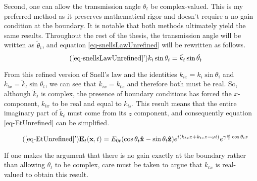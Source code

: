 \documentclass[12pt]{uthesis-v12}
\begin{document}
Second, one can allow the transmission angle $\theta_t$ be complex-valued. This is my preferred method as it preserves mathematical rigor and doesn't require a no-gain condition at the boundary. It is notable that both methods ultimately yield the same results. Throughout the rest of the thesis, the transmission angle will be written as $\tilde{\theta}_t$, and equation \ref{eq-snellsLawUnrefined} will be rewritten as follows.
\begin{equation}\label{eq-snellsLaw}
\tag{\ref{eq-snellsLawUnrefined}'}
k_i\sin\theta_i=\tilde{k_t}\sin\tilde{\theta_t}
\end{equation}

From this refined version of Snell's law and the identities $k_{ix}=k_i\sin\theta_i$ and $k_{tx}=\tilde{k}_t\sin\theta_t$, we can see that $k_{ix}=k_{tx}$ and therefore both must be real. So, although $\tilde{k}_t$ is complex, the presence of boundary conditions has forced the $x$-component, $k_{tx}$ to be real and equal to $k_{is}$. This result means that the entire imaginary part of $\tilde{k}_t$ must come from its $z$ component, and consequently equation \ref{eq-EtUnrefined} can be simplified.

\begin{equation}
\label{eq-Et}
\tag{\ref{eq-EtUnrefined}$'$}
\mathbf{E}_t(\mathbf{x},t)=E_{0t}(\cos\theta_t\mathbf{\hat{x}}-\sin\theta_t\mathbf{\hat{z}})
e^{i(k_{tx}x+k_{tz}z-\omega t)}
e^{\gamma\frac{\omega}{c}\cos\theta_tz}
\end{equation}

If one makes the argument that there is no gain exactly at the boundary rather than allowing $\theta_t$ to be complex, care must be taken to argue that $k_{tx}$ is real-valued to obtain this result.
\end{document}
